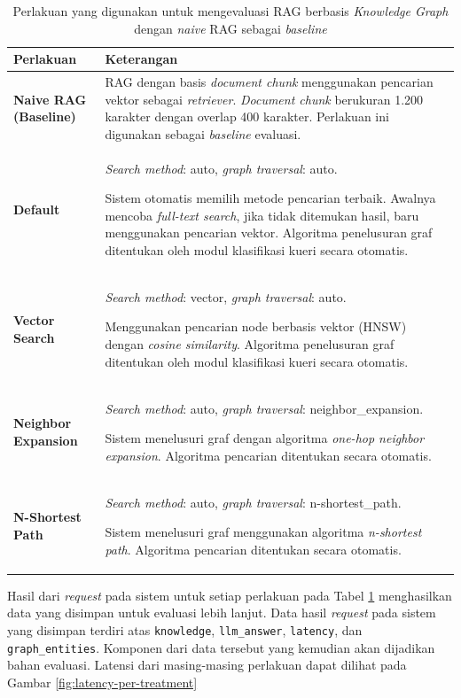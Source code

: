 \begin{table}[H]
	\centering
	\caption{Perlakuan yang digunakan untuk mengevaluasi RAG berbasis \textit{Knowledge Graph} dengan \textit{naive} RAG sebagai \textit{baseline}}
	\label{tab:evaluation-treatment}
	\begin{tabular}{|l|p{9cm}|}
		\hline
		\textbf{Perlakuan}            & \textbf{Keterangan}                                 \\
		\hline \hline
		\textbf{Naive RAG (Baseline)} &
		RAG dengan basis \textit{document chunk} menggunakan pencarian vektor sebagai \textit{retriever}.
		\textit{Document chunk} berukuran 1.200 karakter dengan overlap 400 karakter.
		Perlakuan ini digunakan sebagai \textit{baseline} evaluasi.                         \\
		\hline
		\textbf{Default}              &
		\textit{Search method}: auto, \textit{graph traversal}: auto.

		Sistem otomatis memilih metode pencarian terbaik.
		Awalnya mencoba \textit{full-text search}, jika tidak ditemukan hasil, baru menggunakan pencarian vektor.
		Algoritma penelusuran graf ditentukan oleh modul klasifikasi kueri secara otomatis. \\
		\hline
		\textbf{Vector Search}        &
		\textit{Search method}: vector, \textit{graph traversal}: auto.

		Menggunakan pencarian node berbasis vektor (HNSW) dengan \textit{cosine similarity}.
		Algoritma penelusuran graf ditentukan oleh modul klasifikasi kueri secara otomatis. \\
		\hline
		\textbf{Neighbor Expansion}   &
		\textit{Search method}: auto, \textit{graph traversal}: neighbor\_expansion.

		Sistem menelusuri graf dengan algoritma \textit{one-hop neighbor expansion}.
		Algoritma pencarian ditentukan secara otomatis.                                     \\
		\hline
		\textbf{N-Shortest Path}      &
		\textit{Search method}: auto, \textit{graph traversal}: n-shortest\_path.

		Sistem menelusuri graf menggunakan algoritma \textit{n-shortest path}.
		Algoritma pencarian ditentukan secara otomatis.                                     \\
		\hline
	\end{tabular}
\end{table}

Hasil dari \textit{request} pada sistem untuk setiap perlakuan pada Tabel \ref{tab:evaluation-treatment} menghasilkan data yang disimpan untuk evaluasi lebih lanjut.
Data hasil \textit{request} pada sistem yang disimpan terdiri atas \texttt{knowledge}, \texttt{llm\_answer}, \texttt{latency}, dan \texttt{graph\_entities}.
Komponen dari data tersebut yang kemudian akan dijadikan bahan evaluasi.
Latensi dari masing-masing perlakuan dapat dilihat pada Gambar \ref{fig:latency-per-treatment}

